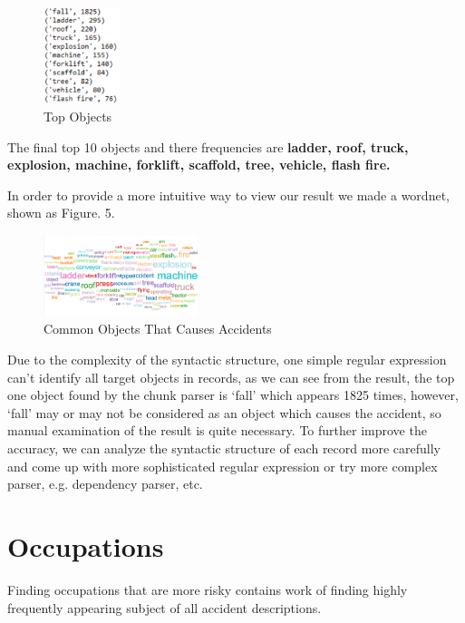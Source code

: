 \documentclass[DIV=calc, paper=a4, fontsize=11pt, twocolumn]{scrartcl}	 %
\begin{document}
\begin{figure}[h!]
  \centering
      \includegraphics[width=0.2\textwidth]{obj11.png}
   \caption{Top Objects}
\end{figure}

The final top 10 objects and there frequencies are {\bf ladder, roof,
  truck, explosion, machine, forklift, scaffold, tree, vehicle, flash fire.
}

In order to provide a more intuitive way to view our result we made a
wordnet, shown as Figure. 5.


\begin{figure}[h!]
  \centering
      \includegraphics[width=0.4\textwidth]{common_objects.png}
   \caption{Common Objects That Causes Accidents}
\end{figure}


Due to the complexity of the syntactic structure, one simple regular
expression can’t identify all target objects in records, as we can see
from the result, the top one object found by the chunk parser is
‘fall’ which appears 1825 times, however, ‘fall’ may or may not be
considered as an object which causes the accident, so manual
examination of the result is quite necessary. To further improve the
accuracy, we can analyze the syntactic structure of each record more
carefully and come up with more sophisticated regular expression or
try more complex parser, e.g. dependency parser, etc.



\section{Occupations}

Finding occupations that are more risky contains work of finding
highly frequently appearing subject of all accident descriptions.
\end{document}
